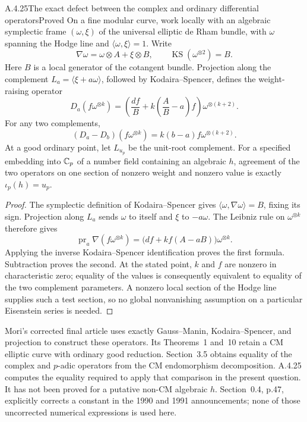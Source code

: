 \begin{result}{A.4.25}{The exact defect between the complex and ordinary differential operators}{Proved}
On a fine modular curve, work locally with an algebraic symplectic frame $(\omega,\xi)$ of the universal elliptic de Rham bundle, with $\omega$ spanning the Hodge line and $\langle\omega,\xi\rangle=1$. Write
\[
 \nabla\omega=\omega\otimes A+\xi\otimes B,
 \qquad \operatorname{KS}(\omega^{\otimes2})=B.
\]
Here $B$ is a local generator of the cotangent bundle. Projection along the complement $L_a=\langle\xi+a\omega\rangle$, followed by Kodaira--Spencer, defines the weight-raising operator
\[
 D_a(f\omega^{\otimes k})
 =\left(\frac{df}{B}+k\left(\frac AB-a\right)f\right)
   \omega^{\otimes(k+2)}.
\]
For any two complements,
\[
 (D_a-D_b)(f\omega^{\otimes k})
   =k(b-a)f\omega^{\otimes(k+2)}.
\]
At a good ordinary point, let $L_{u_p}$ be the unit-root complement. For a specified embedding into $\mathbb C_p$ of a number field containing an algebraic $h$, agreement of the two operators on one section of nonzero weight and nonzero value is exactly
$\iota_p(h)=u_p$.
\end{result}
\begin{proof}
The symplectic definition of Kodaira--Spencer gives
$\langle\omega,\nabla\omega\rangle=B$, fixing its sign. Projection along $L_a$ sends $\omega$ to itself and $\xi$ to $-a\omega$. The Leibniz rule on $\omega^{\otimes k}$ therefore gives
\[
 \operatorname{pr}_a\nabla(f\omega^{\otimes k})
 =\bigl(df+kf(A-aB)\bigr)\omega^{\otimes k}.
\]
Applying the inverse Kodaira--Spencer identification proves the first formula. Subtraction proves the second. At the stated point, $k$ and $f$ are nonzero in characteristic zero; equality of the values is consequently equivalent to equality of the two complement parameters. A nonzero local section of the Hodge line supplies such a test section, so no global nonvanishing assumption on a particular Eisenstein series is needed.
\end{proof}

Mori's corrected final article \cite[Sections 3.3--3.5, pp.56--57]{EllMori1994} uses exactly Gauss--Manin, Kodaira--Spencer, and projection to construct these operators. Its Theorems~1 and~10 retain a CM elliptic curve with ordinary good reduction. Section~3.5 obtains equality of the complex and $p$-adic operators from the CM endomorphism decomposition. A.4.25 computes the equality required to apply that comparison in the present question. It has not been proved for a putative non-CM algebraic $h$. Section~0.4, p.47, explicitly corrects a constant in the 1990 and 1991 announcements; none of those uncorrected numerical expressions is used here.

